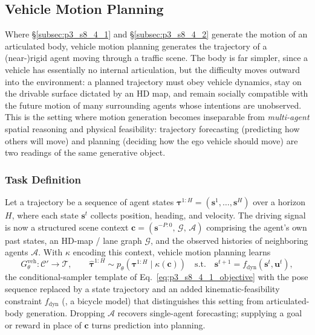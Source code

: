 \subsection{Vehicle Motion Planning}
\label{subsec:p3_s8_4_3}
Where §\ref{subsec:p3_s8_4_1} and §\ref{subsec:p3_s8_4_2} generate the motion of an articulated body, vehicle motion planning generates the trajectory of a (near-)rigid agent moving through a traffic scene.
The body is far simpler, since a vehicle has essentially no internal articulation, but the difficulty moves outward into the environment: a planned trajectory must obey vehicle dynamics, stay on the drivable surface dictated by an HD map, and remain socially compatible with the future motion of many surrounding agents whose intentions are unobserved.
This is the setting where motion generation becomes inseparable from \emph{multi-agent} spatial reasoning and physical feasibility: trajectory forecasting (predicting how others will move) and planning (deciding how the ego vehicle should move) are two readings of the same generative object.

\subsubsection{Task Definition}
\label{subsubsec:p3_s8_4_3_task}
Let a trajectory be a sequence of agent states $\boldsymbol{\tau}^{1:H}=(\mathbf{s}^1,\dots,\mathbf{s}^H)$ over a horizon $H$, where each state $\mathbf{s}^t$ collects position, heading, and velocity.
The driving signal is now a structured scene context $\mathbf{c}=(\mathbf{s}^{-P:0},\,\mathcal{G},\,\mathcal{A})$ comprising the agent's own past states, an HD-map / lane graph $\mathcal{G}$, and the observed histories of neighboring agents $\mathcal{A}$.
With $\kappa$ encoding this context, vehicle motion planning learns
\begin{equation}
\label{eq:p3_s8_4_3_objective}
G_\theta^{\text{veh}}:\mathcal{C}'\!\to\!\mathcal{T},\qquad
\hat{\boldsymbol{\tau}}^{1:H}\sim p_\theta\!\left(\boldsymbol{\tau}^{1:H}\mid\kappa(\mathbf{c})\right)
\quad\text{s.t.}\quad
\mathbf{s}^{t+1}=f_{\text{dyn}}(\mathbf{s}^{t},\mathbf{u}^{t}),
\end{equation}
the conditional-sampler template of Eq.~\eqref{eq:p3_s8_4_1_objective} with the pose sequence replaced by a state trajectory and an added kinematic-feasibility constraint $f_{\text{dyn}}$ (\eg, a bicycle model) that distinguishes this setting from articulated-body generation.
Dropping $\mathcal{A}$ recovers single-agent forecasting; supplying a goal or reward in place of $\mathbf{c}$ turns prediction into planning.


